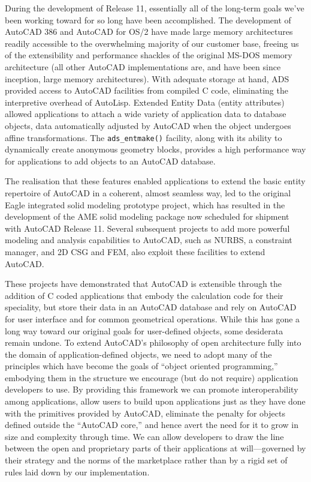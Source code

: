 \documentclass{article}
\begin{document}
During the development of Release 11, essentially all of the long-term
goals we've been working toward for so long have been accomplished.  The
development of AutoCAD 386 and AutoCAD for OS/2 have made large memory
architectures readily accessible to the overwhelming majority of our
customer base, freeing us of the extensibility and performance
shackles of the original MS-DOS memory architecture (all other AutoCAD
implementations are, and have been since inception, large memory
architectures).  With adequate storage at hand, ADS provided
access to AutoCAD facilities from compiled C code, eliminating the
interpretive overhead of AutoLisp.  Extended Entity Data (entity
attributes) allowed applications to attach a wide variety of
application data to database objects, data automatically
adjusted by AutoCAD when the object undergoes affine transformations.
The \verb+ads_entmake()+ facility, along with its ability to
dynamically create anonymous geometry blocks, provides a high
performance way for applications to add objects to an AutoCAD
database.

The realisation that these features enabled applications to extend the
basic entity repertoire of AutoCAD in a coherent, almost seamless way, led to
the original Eagle integrated solid modeling prototype project, which
has resulted in the development of the AME solid modeling
package now scheduled for shipment with AutoCAD Release 11.
Several subsequent projects to add more powerful modeling and analysis
capabilities to AutoCAD, such as NURBS, a constraint manager, and 2D
CSG and FEM, also exploit these facilities to extend AutoCAD\@.

These projects have demonstrated that AutoCAD is extensible through
the addition of C coded applications that embody the calculation code
for their speciality, but store their data in an AutoCAD database and
rely on AutoCAD for user interface and for common geometrical
operations.  While this has gone a long way toward our original goals
for user-defined objects, some desiderata remain undone.  To extend
AutoCAD's philosophy of open architecture fully into the domain of
application-defined objects, we need to adopt many of the principles
which have become the goals of ``object oriented programming,''
embodying them in the structure we encourage (but do not require)
application developers to use.  By providing this framework we can
promote interoperability among applications, allow users to build upon
applications just as they have done with the primitives provided by
AutoCAD, eliminate the penalty for objects defined outside the
``AutoCAD core,'' and hence avert the need for it to grow in size and
complexity through time. We can allow developers to draw the line between
the open and proprietary parts of their applications at
will---governed by their strategy and the norms of the marketplace
rather than by a rigid set of rules laid down by our implementation.
\end{document}

